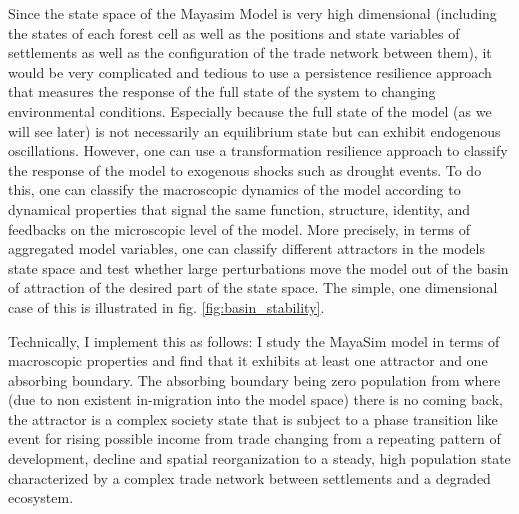 
Since the state space of the Mayasim Model is very high dimensional (including the states of each forest cell as well as the positions and state variables of settlements as well as the configuration of the trade network between them), it would be very complicated and tedious to use a persistence resilience approach that measures the response of the full state of the system to changing environmental conditions. Especially because the full state of the model (as we will see later) is not necessarily an equilibrium state but can exhibit endogenous oscillations.
However, one can use a transformation resilience approach to classify the response of the model to exogenous shocks such as drought events.
To do this, one can classify the macroscopic dynamics of the model according to dynamical properties that signal the same function, structure, identity, and feedbacks on the microscopic level of the model. More precisely, in terms of aggregated model variables, one can classify different attractors in the models state space and test whether large perturbations move the model out of the basin of attraction of the desired part of the state space. The simple, one dimensional case of this is illustrated in fig. \ref{fig:basin_stability}.

Technically, I implement this as follows:
I study the MayaSim model in terms of macroscopic properties and find that it exhibits at least one attractor and one absorbing boundary. The absorbing boundary being zero population from where (due to non existent in-migration into the model space) there is no coming back, the attractor is a complex society state that is subject to a phase transition like event for rising possible income from trade changing from a repeating pattern of development, decline and spatial reorganization to a steady, high population state characterized by a complex trade network between settlements and a degraded ecosystem.

